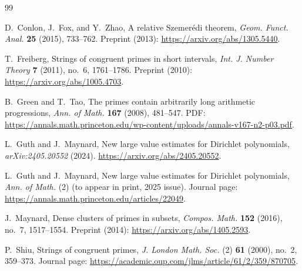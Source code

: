 \documentclass[11pt]{amsart}
\theoremstyle{definition}
\theoremstyle{remark}
\numberwithin{equation}{section}
\begin{document}
\begin{thebibliography}{99}

D.~Conlon, J.~Fox, and Y.~Zhao,
\newblock A relative Szemerédi theorem,
\newblock \emph{Geom. Funct. Anal.} \textbf{25} (2015), 733--762.
Preprint (2013): \url{https://arxiv.org/abs/1305.5440}.

T.~Freiberg,
\newblock Strings of congruent primes in short intervals,
\newblock \emph{Int. J. Number Theory} \textbf{7} (2011), no.~6, 1761--1786.
Preprint (2010): \url{https://arxiv.org/abs/1005.4703}.

B.~Green and T.~Tao,
\newblock The primes contain arbitrarily long arithmetic progressions,
\newblock \emph{Ann. of Math.} \textbf{167} (2008), 481--547.
\newblock PDF: \url{https://annals.math.princeton.edu/wp-content/uploads/annals-v167-n2-p03.pdf}.

L.~Guth and J.~Maynard,
\newblock New large value estimates for Dirichlet polynomials,
\newblock \emph{arXiv:2405.20552} (2024).
\newblock \url{https://arxiv.org/abs/2405.20552}.

L.~Guth and J.~Maynard,
\newblock New large value estimates for Dirichlet polynomials,
\newblock \emph{Ann. of Math.} (2) (to appear in print, 2025 issue).
\newblock Journal page: \url{https://annals.math.princeton.edu/articles/22049}.

J.~Maynard,
\newblock Dense clusters of primes in subsets,
\newblock \emph{Compos. Math.} \textbf{152} (2016), no.~7, 1517--1554.
Preprint (2014): \url{https://arxiv.org/abs/1405.2593}.

P.~Shiu,
\newblock Strings of congruent primes,
\newblock \emph{J. London Math. Soc.} (2) \textbf{61} (2000), no.~2, 359--373.
\newblock Journal page: \url{https://academic.oup.com/jlms/article/61/2/359/870705}.

\end{thebibliography}
\end{document}
